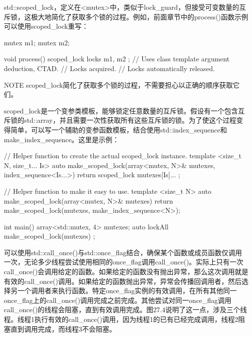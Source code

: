 
std::scoped\_lock，定义在<mutex>中，类似于lock\_guard，但接受可变数量的互斥锁，这极大地简化了获取多个锁的过程。例如，前面章节中的process()函数示例可以使用scoped\_lock重写：

\begin{cpp}
mutex m1;
mutex m2;

void process()
{
    scoped_lock locks { m1, m2 }; // Uses class template argument deduction, CTAD.
    // Locks acquired.
} // Locks automatically released.
\end{cpp}

\begin{myNotic}{NOTE}
scoped\_lock简化了获取多个锁的过程，不需要担心以正确的顺序获取它们。
\end{myNotic}

scoped\_lock是一个变参类模板，能够锁定任意数量的互斥锁。假设有一个包含互斥锁的std::array，并且需要一次性获取所有这些互斥锁的锁。为了使这个过程变得简单，可以写一个辅助的变参函数模板，结合使用std::index\_sequence和make\_index\_sequence。这里是示例：

\begin{cpp}
// Helper function to create the actual scoped_lock instance.
template <size_t N, size_t... Is>
auto make_scoped_lock(array<mutex, N>& mutexes, index_sequence<Is...>)
{
    return scoped_lock { mutexes[Is]... };
}

// Helper function to make it easy to use.
template <size_t N>
auto make_scoped_lock(array<mutex, N>& mutexes)
{
    return make_scoped_lock(mutexes, make_index_sequence<N>{});
}

int main()
{
    array<std::mutex, 4> mutexes;
    auto lockAll { make_scoped_lock(mutexes) };
}
\end{cpp}


可以使用std::call\_once()与std::once\_flag结合，确保某个函数或成员函数仅调用一次，无论多少线程尝试使用相同的once\_flag调用call\_once()。实际上只有一次call\_once()会调用给定的函数。如果给定的函数没有抛出异常，那么这次调用就是有效的call\_once()调用。如果给定的函数抛出异常，异常会传播回调用者，然后选择另一个调用者来执行函数。特定once\_flag实例的有效调用，在所有其他同一once\_flag上的call\_once()调用完成之前完成。其他尝试对同一once\_flag调用call\_once()的线程会阻塞，直到有效调用完成。图27.4说明了这一点，涉及三个线程。线程1执行有效的call\_once()调用，因为线程1的已有已经完成调用，线程2阻塞直到调用完成，而线程3不会阻塞。

